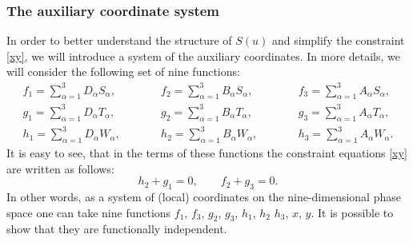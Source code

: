 \documentclass[10pt,a4paper]{amsart}
\def\a{\alpha}
\numberwithin{equation}{section}
\begin{document}
\subsubsection{The auxiliary coordinate system}
In order to better understand the structure of $S(u)$ and simplify the constraint \eqref{xy}, we will introduce a system of the auxiliary coordinates. In more details, we will consider the following set of nine functions:
\begin{subequations}\label{fgh}
\begin{alignat}{4}
 &f_1 = \sum\limits_{\a=1}^3 D_{\a} S_{\a},\qquad&&
 f_2 = \sum\limits_{\a=1}^3 B_{\a} S_{\a}, \qquad&&
 f_3 = \sum\limits_{\a=1}^3 A_{\a} S_{\a},&
\\
& g_1 = \sum\limits_{\a=1}^3 D_{\a} T_{\a},\qquad&&
 g_2 = \sum\limits_{\a=1}^3 B_{\a} T_{\a}, \qquad&&
 g_3 = \sum\limits_{\a=1}^3 A_{\a} T_{\a},&
\\
& h_1 = \sum\limits_{\a=1}^3 D_{\a} W_{\a},\qquad&&
 h_2 = \sum\limits_{\a=1}^3 B_{\a} W_{\a}, \qquad&&
 h_3 = \sum\limits_{\a=1}^3 A_{\a} W_{\a}.&
 \end{alignat}
\end{subequations}
It is easy to see, that in the terms of these functions the constraint equations \eqref{xy} are written as follows:
\begin{equation}\label{mconstr}
h_2+g_1=0,\qquad f_2 +g_3=0.
\end{equation}
In other words, as a system of (local) coordinates on the nine-dimensional phase space one can take nine functions $f_1$, $f_3$, $g_2$, $g_3$, $h_1$, $h_2$ $h_3$, $x$, $y$. It is possible to show that they are functionally independent.
\end{document}
